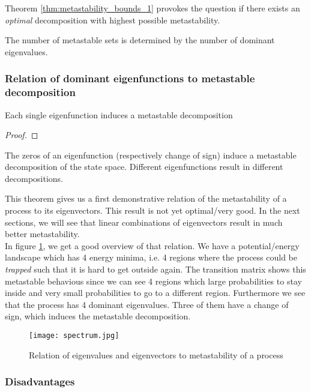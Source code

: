 {{Theorem \ref{thm:metastability_bounds_1} provokes the question if there exists an \textit{optimal} decomposition with highest possible metastability. 

The number of metastable sets is determined by the number of dominant eigenvalues.

\subsubsection*{Relation of dominant eigenfunctions to metastable decomposition}
\begin{thm}
Each single eigenfunction induces a metastable decomposition
\end{thm}
\begin{proof}
\end{proof}
The zeros of an eigenfunction (respectively change of sign) induce a metastable decomposition of the state space.
Different eigenfunctions result in different decompositions.

This theorem gives us a first demonstrative relation of the metastability of a process to its eigenvectors. This result is not yet optimal/very good. In the next sections, we will see that linear combinations of eigenvectors result in much better metastability.
\\

In figure \ref{fig:spectrum}, we get a good overview of that relation. We have a potential/energy landscape which has 4 energy minima, i.e. 4 regions where the process could be \textit{trapped} such that it is hard to get outside again. The transition matrix  shows this metastable behavious since we can see 4 regions which large probabilities to stay inside and very small probabilities to go to a different region.
Furthermore we see that the process has 4 dominant eigenvalues. Three of them have a change of sign, which induces the metastable decomposition.

\begin{figure}[!ht]
	\label{fig:spectrum}
	\centering
	\texttt{[image: spectrum.jpg]} %
	\caption{Relation of eigenvalues and eigenvectors to metastability of a process}
\end{figure}

\subsubsection*{Disadvantages}

}}
